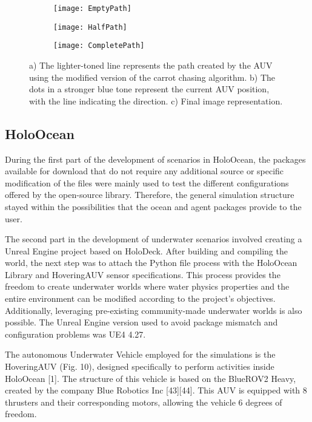 \documentclass[]{article}
\begin{document}
\begin{figure}[h]
	\begin{subfigure}{.33\textwidth}
		\centering
		\texttt{[image: EmptyPath]}
		\caption{}
	\end{subfigure}
	\begin{subfigure}{.33\textwidth}
		\centering
		\texttt{[image: HalfPath]}
		\caption{}
	\end{subfigure}
	\begin{subfigure}{.33\textwidth}
		\centering
		\texttt{[image: CompletePath]}
		\caption{}
	\end{subfigure}
	\caption{a) The lighter-toned line represents the path created by the AUV using the modified version of the carrot chasing algorithm. b) The dots in a stronger blue tone represent the current AUV position, with the line indicating the direction. c) Final image representation.}
\end{figure}

	
	\subsection{HoloOcean}
	
	During the first part of the development of scenarios in HoloOcean, the packages available for download that do not require any additional source or specific modification of the files were mainly used to test the different configurations offered by the open-source library. Therefore, the general simulation structure stayed within the possibilities that the ocean and agent packages provide to the user. 
	
	The second part in the development of underwater scenarios involved creating a Unreal Engine project based on HoloDeck. After building and compiling the world, the next step was to attach the Python file process with the HoloOcean Library and HoveringAUV sensor specifications. This process provides the freedom to create underwater worlds where water physics properties and the entire environment can be modified according to the project's objectives. Additionally, leveraging pre-existing community-made underwater worlds is also possible. The Unreal Engine version used to avoid package mismatch and configuration problems was UE4 4.27.
	
	The autonomous Underwater Vehicle employed for the simulations is the HoveringAUV (Fig. 10), designed specifically to perform activities inside HoloOcean [1]. The structure of this vehicle is based on the BlueROV2 Heavy, created by the company Blue Robotics Inc [43][44]. This AUV is equipped with 8 thrusters and their corresponding motors, allowing the vehicle 6 degrees of freedom.
	
\end{document}
